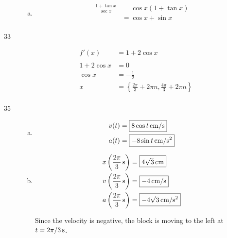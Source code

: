 \documentclass[letterpaper, landscape]{exam}
\begin{document}
\begin{description}
\begin{enumerate}[(a)]
        \item
          \begin{align*}
            \frac{1 + \tan x}{\sec x} & = \cos x (1 + \tan x) \\
                                      & = \cos x + \sin x \\
          \end{align*}
      \end{enumerate}

    \item[33] 
      \begin{align*}
        f'(x)        & = 1 + 2 \cos x \\
        \\
        1 + 2 \cos x & = 0 \\
        \cos x       & = - \frac{1}{2} \\
        x            & = \boxed{ \left\{ \frac{2 \pi}{3} + 2 \pi n, \frac{4 \pi}{3} + 2 \pi n \right\} } \\
      \end{align*}

    \item[35] 
      \begin{enumerate}[(a)]
        \item 
          \begin{align*}
            v(t)   & = \boxed{ \unit[8 \cos t]{cm/s} } \\
            a(t)   & = \boxed{ \unit[- 8 \sin t]{cm/s^2} } \\
          \end{align*}

        \item 
          \begin{align*}
            x \left(\unit[\frac{2 \pi}{3}]{s} \right) & = \boxed{ \unit[4 \sqrt{3}]{cm} } \\
            v \left(\unit[\frac{2 \pi}{3}]{s} \right) & = \boxed{ \unit[-4]{cm/s} } \\
            a \left(\unit[\frac{2 \pi}{3}]{s} \right) & = \boxed{ \unit[- 4 \sqrt{3}]{cm/s^2} } \\
          \end{align*}

          Since the velocity is negative, the block is moving to the left at 
          $t = \unit[2 \pi/3]{s}$.

      \end{enumerate}


\end{description}
\end{document}
